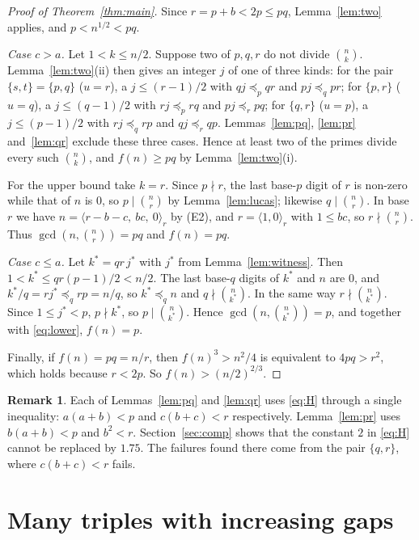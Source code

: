 \documentclass[11pt,a4paper]{article}
\theoremstyle{definition}
\newtheorem{remark}[theorem]{Remark}
\newcommand{\dom}[1]{\preceq_{#1}}
\newcommand{\bin}[2]{\binom{#1}{#2}}
\newcommand{\dig}[1]{\langle #1\rangle}
\begin{document}
\begin{proof}[Proof of Theorem~\ref{thm:main}]
Since $r=p+b<2p\le pq$, Lemma~\ref{lem:two} applies, and $p<n^{1/2}<pq$.

\emph{Case $c>a$.} Let $1<k\le n/2$. Suppose two of $p,q,r$ do not divide $\bin nk$. Lemma~\ref{lem:two}(ii) then gives an integer $j$ of one of three kinds: for the pair $\{s,t\}=\{p,q\}$ ($u=r$), a $j\le(r-1)/2$ with $qj\dom p qr$ and $pj\dom q pr$; for $\{p,r\}$ ($u=q$), a $j\le(q-1)/2$ with $rj\dom p rq$ and $pj\dom r pq$; for $\{q,r\}$ ($u=p$), a $j\le(p-1)/2$ with $rj\dom q rp$ and $qj\dom r qp$. Lemmas~\ref{lem:pq}, \ref{lem:pr} and~\ref{lem:qr} exclude these three cases. Hence at least two of the primes divide every such $\bin nk$, and $f(n)\ge pq$ by Lemma~\ref{lem:two}(i).

For the upper bound take $k=r$. Since $p\nmid r$, the last base-$p$ digit of $r$ is non-zero while that of $n$ is $0$, so $p\mid\bin nr$ by Lemma~\ref{lem:lucas}; likewise $q\mid\bin nr$. In base $r$ we have $n=\dig{r-b-c,\ bc,\ 0}_r$ by (E2), and $r=\dig{1,0}_r$ with $1\le bc$, so $r\nmid\bin nr$. Thus $\gcd(n,\bin nr)=pq$ and $f(n)=pq$.

\emph{Case $c\le a$.} Let $k^*=qr\,j^*$ with $j^*$ from Lemma~\ref{lem:witness}. Then $1<k^*\le qr(p-1)/2<n/2$. The last base-$q$ digits of $k^*$ and $n$ are $0$, and $k^*/q=rj^*\dom q rp=n/q$, so $k^*\dom q n$ and $q\nmid\bin n{k^*}$. In the same way $r\nmid\bin n{k^*}$. Since $1\le j^*<p$, $p\nmid k^*$, so $p\mid\bin n{k^*}$. Hence $\gcd(n,\bin n{k^*})=p$, and together with \eqref{eq:lower}, $f(n)=p$.

Finally, if $f(n)=pq=n/r$, then $f(n)^3>n^2/4$ is equivalent to $4pq>r^2$, which holds because $r<2p$. So $f(n)>(n/2)^{2/3}$.
\end{proof}

\begin{remark}
Each of Lemmas~\ref{lem:pq} and \ref{lem:qr} uses \eqref{eq:H} through a single inequality: $a(a+b)<p$ and $c(b+c)<r$ respectively. Lemma~\ref{lem:pr} uses $b(a+b)<p$ and $b^2<r$. Section~\ref{sec:comp} shows that the constant $2$ in \eqref{eq:H} cannot be replaced by $1.75$. The failures found there come from the pair $\{q,r\}$, where $c(b+c)<r$ fails.
\end{remark}

\section{Many triples with increasing gaps}\label{sec:many}
\end{document}
